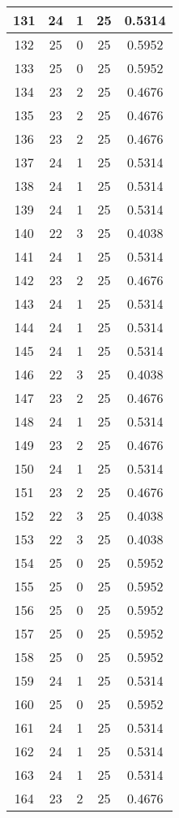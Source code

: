 \documentclass[letterpaper, 12pt]{article}
\begin{document}
\begin{longtable}{|c|c|c|c|c|}
\hline
131 & 24 & 1 & 25 & 0.5314 \\
\hline
132 & 25 & 0 & 25 & 0.5952 \\
\hline
133 & 25 & 0 & 25 & 0.5952 \\
\hline
134 & 23 & 2 & 25 & 0.4676 \\
\hline
135 & 23 & 2 & 25 & 0.4676 \\
\hline
136 & 23 & 2 & 25 & 0.4676 \\
\hline
137 & 24 & 1 & 25 & 0.5314 \\
\hline
138 & 24 & 1 & 25 & 0.5314 \\
\hline
139 & 24 & 1 & 25 & 0.5314 \\
\hline
140 & 22 & 3 & 25 & 0.4038 \\
\hline
141 & 24 & 1 & 25 & 0.5314 \\
\hline
142 & 23 & 2 & 25 & 0.4676 \\
\hline
143 & 24 & 1 & 25 & 0.5314 \\
\hline
144 & 24 & 1 & 25 & 0.5314 \\
\hline
145 & 24 & 1 & 25 & 0.5314 \\
\hline
146 & 22 & 3 & 25 & 0.4038 \\
\hline
147 & 23 & 2 & 25 & 0.4676 \\
\hline
148 & 24 & 1 & 25 & 0.5314 \\
\hline
149 & 23 & 2 & 25 & 0.4676 \\
\hline
150 & 24 & 1 & 25 & 0.5314 \\
\hline
151 & 23 & 2 & 25 & 0.4676 \\
\hline
152 & 22 & 3 & 25 & 0.4038 \\
\hline
153 & 22 & 3 & 25 & 0.4038 \\
\hline
154 & 25 & 0 & 25 & 0.5952 \\
\hline
155 & 25 & 0 & 25 & 0.5952 \\
\hline
156 & 25 & 0 & 25 & 0.5952 \\
\hline
157 & 25 & 0 & 25 & 0.5952 \\
\hline
158 & 25 & 0 & 25 & 0.5952 \\
\hline
159 & 24 & 1 & 25 & 0.5314 \\
\hline
160 & 25 & 0 & 25 & 0.5952 \\
\hline
161 & 24 & 1 & 25 & 0.5314 \\
\hline
162 & 24 & 1 & 25 & 0.5314 \\
\hline
163 & 24 & 1 & 25 & 0.5314 \\
\hline
164 & 23 & 2 & 25 & 0.4676 \\

\end{longtable}
\end{document}
